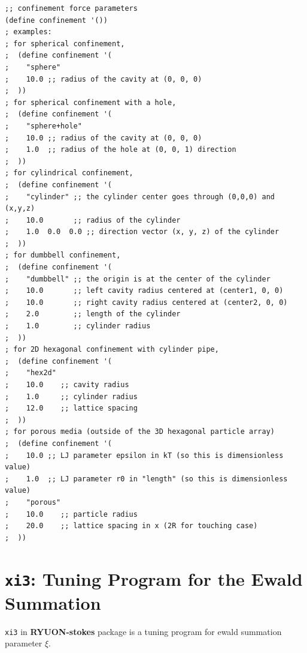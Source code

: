 \documentclass{book}
\begin{document}
{\begin{verbatim}
;; confinement force parameters
(define confinement '())
; examples:
; for spherical confinement,
;  (define confinement '(
;    "sphere"
;    10.0 ;; radius of the cavity at (0, 0, 0)
;  ))
; for spherical confinement with a hole,
;  (define confinement '(
;    "sphere+hole"
;    10.0 ;; radius of the cavity at (0, 0, 0)
;    1.0  ;; radius of the hole at (0, 0, 1) direction
;  ))
; for cylindrical confinement,
;  (define confinement '(
;    "cylinder" ;; the cylinder center goes through (0,0,0) and (x,y,z)
;    10.0       ;; radius of the cylinder
;    1.0  0.0  0.0 ;; direction vector (x, y, z) of the cylinder
;  ))
; for dumbbell confinement,
;  (define confinement '(
;    "dumbbell" ;; the origin is at the center of the cylinder
;    10.0       ;; left cavity radius centered at (center1, 0, 0)
;    10.0       ;; right cavity radius centered at (center2, 0, 0)
;    2.0        ;; length of the cylinder
;    1.0        ;; cylinder radius
;  ))
; for 2D hexagonal confinement with cylinder pipe,
;  (define confinement '(
;    "hex2d"
;    10.0    ;; cavity radius
;    1.0     ;; cylinder radius
;    12.0    ;; lattice spacing
;  ))
; for porous media (outside of the 3D hexagonal particle array)
;  (define confinement '(
;    10.0 ;; LJ parameter epsilon in kT (so this is dimensionless value)
;    1.0  ;; LJ parameter r0 in "length" (so this is dimensionless value)
;    "porous"
;    10.0    ;; particle radius
;    20.0    ;; lattice spacing in x (2R for touching case)
;  ))
\end{verbatim}
}



\section{{\tt xi3}:
  Tuning Program for the Ewald Summation}
\label{sec:xi3}
{\tt xi3} in {\bf RYUON-stokes} package
is a tuning program for ewald summation parameter $\xi$.
\end{document}
